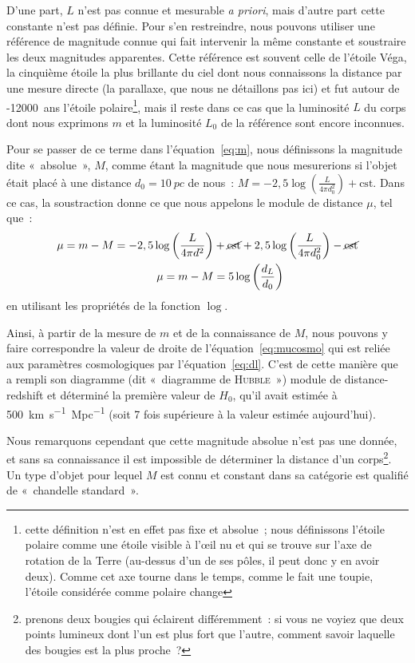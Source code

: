 \documentclass[../main/main.tex]{subfiles}
\begin{document}
D'une part, $L$ n'est pas connue et mesurable \textit{a priori}, mais d'autre
part cette constante n'est pas définie. Pour s'en restreindre, nous pouvons
utiliser une référence de magnitude connue qui fait intervenir la même constante
et soustraire les deux magnitudes apparentes. Cette référence est souvent celle
de l'étoile Véga, la cinquième étoile la plus brillante du ciel dont nous
connaissons la distance par une mesure directe (la parallaxe, que nous ne
détaillons pas ici) et fut autour de -\SI{12000}{ans} l'étoile
polaire\footnote{cette définition n'est en effet pas fixe et absolue~; nous
    définissons l'étoile polaire comme une étoile visible à l'œil nu et qui se
    trouve sur l'axe de rotation de la Terre (au-dessus d'un de ses pôles, il
    peut donc y en avoir deux). Comme cet axe tourne dans le temps, comme le
    fait une
toupie, l'étoile considérée comme polaire change}, mais il reste dans ce cas que
la luminosité $L$ du corps dont nous exprimons $m$ et la luminosité $L_0$ de la
référence sont encore inconnues.

Pour se passer de ce terme dans l'équation~\ref{eq:m}, nous définissons la
magnitude dite «~absolue~», $M$, comme étant la magnitude que nous mesurerions
si l'objet était placé à une distance $d_0 = \SI{10}{pc}$ de nous~: $M =
-2,5\log \left( \frac{L}{4\pi d_0^2} \right) + \text{cst}$. Dans ce cas, la
soustraction donne ce que nous appelons le module de distance $\mu$, tel que~:
\begin{align}\label{eq:mucosmo}
    \mu = m - M = -2,5\log \left( \frac{L}{4\pi d^2} \right) & +
    \cancel{\text{cst}} + 2,5\log \left( \frac{L}{4\pi d_0^2} \right) -
    \cancel{\text{cst}}\nonumber\\
    \mu = m-M & = 5\log \left( \frac{d_L}{d_0} \right)
\end{align}
en utilisant les propriétés de la fonction $\log$.

Ainsi, à partir de la mesure de $m$ et de la connaissance de $M$, nous pouvons y
faire correspondre la valeur de droite de l'équation~\ref{eq:mucosmo} qui est
reliée aux paramètres cosmologiques par l'équation~\ref{eq:dl}. C'est de cette
manière que~\cite{hubble1929} a rempli son diagramme (dit «~diagramme de
\textsc{Hubble}~») module de distance-redshift et déterminé la première valeur
de $H_0$, qu'il avait estimée à \SI{500}{km.s^{-1}.Mpc^{-1}} (soit 7 fois
supérieure à la valeur estimée aujourd'hui).

Nous remarquons cependant que cette magnitude absolue n'est pas une donnée, et
sans sa connaissance il est impossible de déterminer la distance d'un
corps\footnote{prenons deux bougies qui éclairent différemment~: si vous ne
    voyiez que deux points lumineux dont l'un est plus fort que l'autre, comment
savoir laquelle des bougies est la plus proche~?}. Un type d'objet pour lequel
$M$ est connu et constant dans sa catégorie est qualifié de «~chandelle
standard~».
\end{document}
